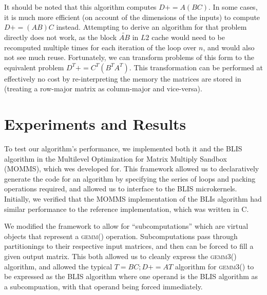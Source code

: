 \documentclass[12pt]{article}
\newcommand*{\TO}{\textbf{to}}
\newcommand*{\pluseq}{\mathrel{{+}{=}}}
\newcommand*{\gemmt}{{\textsc{gemm3()}}}
\newcommand*{\gemm}{{\textsc{gemm()}}}
\begin{document}
\begin{algorithm}
  \caption{Algorithm for \gemmt{}}
  \label{alg:gemm3}
  \begin{algorithmic}
    \For{$j \gets 0, n_C, \ldots$ \TO{} $n$}
    \For{$p \gets 0, k_C, \ldots$ \TO{} $k$}
    \For{$q \gets 0, l_C, \ldots$ \TO{} $l$}
    \For{$i \gets 0, m_C, \ldots$ \TO{} $k_C$}
    \EndFor{}
    \EndFor{}
    \For{$i \gets 0, m_C, \ldots$ \TO{} $m$}
    \EndFor{}
    \EndFor{}
    \EndFor{}
    \EndProcedure{}
  \end{algorithmic}
\end{algorithm}

It should be noted that this algorithm computes $D \pluseq A(BC)$.
In some cases, it is much more efficient (on account of the dimensions of the inputs) to compute $D \pluseq (AB)C$ instead.
Attempting to derive an algorithm for that problem directly does not work, as the block $\tilde{AB}$ in $L2$ cache would need to be recomputed multiple times for each iteration of the loop over $n$, and would also not see much reuse.
Fortunately, we can transform problems of this form to the equivalent problem $D^T \pluseq C^T(B^TA^T)$.
This transformation can be performed at effectively no cost by re-interpreting the memory the matrices are stored in (treating a row-major matrix as column-major and vice-versa).

\section{Experiments and Results}
To test our algorithm's performance, we implemented both it and the BLIS algorithm in the Multilevel Optimization for Matrix Multiply Sandbox (MOMMS), which wes developed for\cite{SmithDiss2017}.
This framework allowed us to declaratively generate the code for an algorithm by specifying the series of loops and packing operations required, and allowed us to interface to the BLIS microkernels.
Initially, we verified that the MOMMS implementation of the BLIs algorithm had similar performance to the reference implementation, which was written in C.

We modified the framework to allow for ``subcomputations'' which are virtual objects that represent a \gemm{} operation.
Subcomputations pass through partitionings to their respective input matrices, and then can be forced to fill a given output matrix.
This both allowed us to cleanly express the \gemmt{} algorithm, and allowed the typical $T = BC; D \pluseq AT$ algorithm for \gemmt{} to be expressed as the BLIS algorithm where one operand is the BLIS algorithm as a subcompuation, with that operand being forced immediately.
\end{document}
